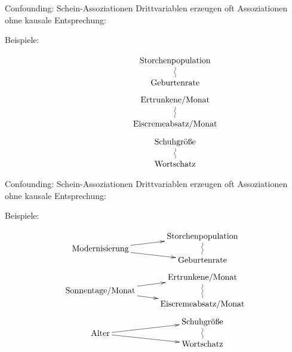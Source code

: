 \documentclass[
  10pt,
  ignorenonframetext,
]{beamer}
\begin{document}
\begin{frame}{Confounding: Schein-Assoziationen}
\protect\hypertarget{confounding-schein-assoziationen}{}
Drittvariablen erzeugen oft Assoziationen ohne kausale Entsprechung:

Beispiele:

\begin{small}
\begin{displaymath}
\xymatrix@R-2pc{
                         &  \text{Storchenpopulation}\ar@{~}[dd]\\
       {\phantom{XX}}  &  \\
                         & \text{Geburtenrate}\\
                         & \\
                         &  \text{Ertrunkene/Monat}\ar@{~}[dd]\\
         {\phantom{XX}} &  \\
                         & \text{Eiscremeabsatz/Monat}\\
                         & \\
                         &  \text{Schuhgröße}\ar@{~}[dd]\\
         {\phantom{XX}} &  \\
                         & \text{Wortschatz}}
\end{displaymath}
\end{small}
\end{frame}

\begin{frame}{Confounding: Schein-Assoziationen}
\protect\hypertarget{confounding-schein-assoziationen-1}{}
Drittvariablen erzeugen oft Assoziationen ohne kausale Entsprechung:

Beispiele:

\begin{small}
\begin{displaymath}
\xymatrix@R-2pc{
                         &  \text{Storchenpopulation}\ar@{~}[dd]\\
        \text{Modernisierung} \ar[dr]\ar[ur] &  \\
                         & \text{Geburtenrate}\\
                         & \\
                         &  \text{Ertrunkene/Monat}\ar@{~}[dd]\\
        \text{Sonnentage/Monat} \ar[dr]\ar[ur] &  \\
                         & \text{Eiscremeabsatz/Monat}\\
                         &  \\
                         &  \text{Schuhgröße}\ar@{~}[dd]\\
        \text{Alter} \ar[dr]\ar[ur] &  \\
                         & \text{Wortschatz}}
\end{displaymath}
\end{small}
\end{frame}
\end{document}
